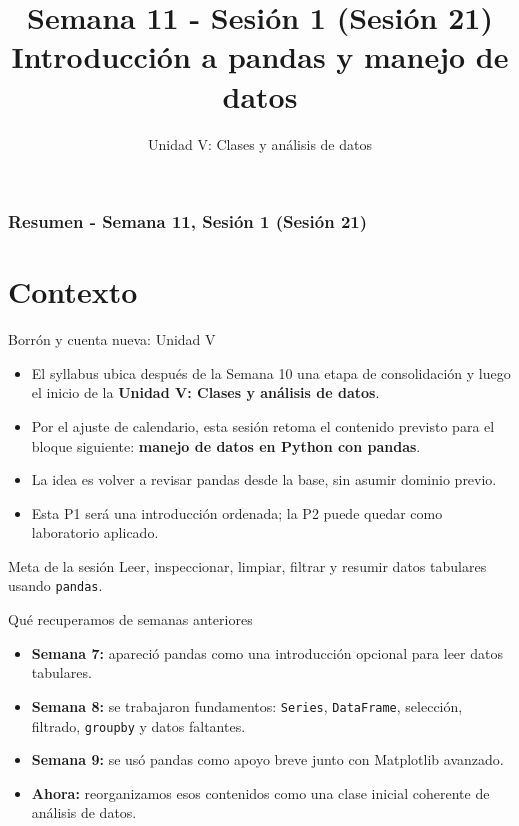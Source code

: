 \documentclass[10pt]{beamer}
\title[Semana 11 - P1]{Semana 11 - Sesión 1 (Sesión 21)\\Introducción a pandas y manejo de datos}
\subtitle{Unidad V: Clases y análisis de datos}
\begin{document}
\myfront{}

\begin{frame}
  \titlepage
\end{frame}

\begin{frame}
  \frametitle{Resumen - Semana 11, Sesión 1 (Sesión 21)}
  \tableofcontents
\end{frame}


\section{Contexto}

\begin{frame}{Borrón y cuenta nueva: Unidad V}
  \begin{itemize}
    \item El syllabus ubica después de la Semana 10 una etapa de consolidación y luego el inicio de la \textbf{Unidad V: Clases y análisis de datos}.
    \item Por el ajuste de calendario, esta sesión retoma el contenido previsto para el bloque siguiente: \textbf{manejo de datos en Python con pandas}.
    \item La idea es volver a revisar pandas desde la base, sin asumir dominio previo.
    \item Esta P1 será una introducción ordenada; la P2 puede quedar como laboratorio aplicado.
  \end{itemize}
  \begin{alertblock}{Meta de la sesión}
    Leer, inspeccionar, limpiar, filtrar y resumir datos tabulares usando \texttt{pandas}.
  \end{alertblock}
\end{frame}

\begin{frame}{Qué recuperamos de semanas anteriores}
  \begin{itemize}
    \item \textbf{Semana 7:} apareció pandas como una introducción opcional para leer datos tabulares.
    \item \textbf{Semana 8:} se trabajaron fundamentos: \texttt{Series}, \texttt{DataFrame}, selección, filtrado, \texttt{groupby} y datos faltantes.
    \item \textbf{Semana 9:} se usó pandas como apoyo breve junto con Matplotlib avanzado.
    \item \textbf{Ahora:} reorganizamos esos contenidos como una clase inicial coherente de análisis de datos.
  \end{itemize}
\end{frame}
\end{document}
